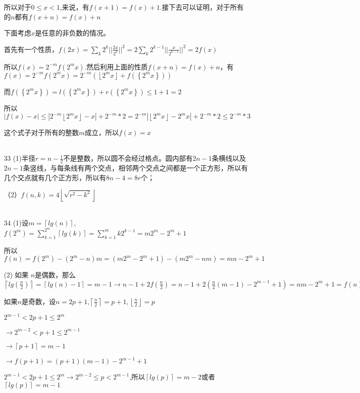 \documentclass[onecolumn]{article}
\begin{document}
所以对于$0 \leq x < 1$,来说，有$f(x+1)=f(x)+1$.接下去可以证明，对于所有的$n$都有$f(x+n)=f(x)+n$ \par
下面考虑$x$是任意的非负数的情况。 \par
首先有一个性质，$f(2x)=\sum _{k}2^{k}||\frac{2x}{2^{k}}||^{2}=2\sum _{k}2^{k-1}||\frac{x}{2^{k-1}}||^{2}=2f(x)$ \par
所以$f(x)=2^{-m}f(2^{m}x)$.然后利用上面的性质$f(x+n)=f(x)+n$，有$f(x)=2^{-m}f(2^{m}x)=2^{-m}(\left \lfloor 2^{m}x \right \rfloor+f(\left \{ 2^{m}x \right \}))$ \par
而$f(\left \{ 2^{m}x \right \})=l(\left \{ 2^{m}x \right \})+r(\left \{ 2^{m}x \right \})\leq 1+1=2$ \par
所以$|f(x)-x|\leq |2^{-m}\left \lfloor 2^{m}x \right \rfloor-x|+2^{-m}*2=2^{-m}|\left \lfloor 2^{m}x \right \rfloor-2^{m}x|+2^{-m}*2\leq 2^{-m}*3$ \par
这个式子对于所有的整数$m$成立，所以$f(x)=x$ \par
~\\
33 (1)半径$r=n-\frac{1}{2}$不是整数，所以圆不会经过格点。圆内部有$2n-1$条横线以及$2n-1$条竖线，与每条线有两个交点，相邻两个交点之间都是一个正方形，所以有几个交点就有几个正方形，所以有$8n-4=8r$个；\par
（2）$f(n,k)=4\left \lfloor \sqrt{r^{2}-k^{2}} \right \rfloor$ \par
~\\
34 (1)设$m=\left \lceil lg(n) \right \rceil$,$f(2^m)=\sum_{k=1}^{2^{m}}\left \lceil lg(k) \right \rceil=\sum_{k=1}^{m}k2^{k-1}=m2^{m}-2^{m}+1$ \par
所以$f(n)=f(2^m)-(2^{m}-n)m=\left (m2^{m}-2^{m}+1  \right )-\left ( m2^{m}-nm \right )=mn-2^{m}+1$ \par
(2) 如果 $n$是偶数，那么$\left \lceil lg(\frac{n}{2}) \right \rceil=\left \lceil lg(n)-1 \right \rceil=m-1\rightarrow n-1+2f(\frac{n}{2})=n-1+2(\frac{n}{2}(m-1)-2^{m-1}+1)=nm-2^{m}+1=f(n)$ \par
如果$n$是奇数，设$n=2p+1$,$\left \lceil \frac{n}{2} \right \rceil=p+1,\left \lfloor \frac{n}{2} \right \rfloor=p$ \par
$2^{m-1}<2p+1\leq 2^{m}$ \par
$\rightarrow 2^{m-2}<p+1\leq 2^{m-1}$ \par
$\rightarrow \left \lceil p+1 \right \rceil=m-1$ \par
$\rightarrow f(p+1)=(p+1)(m-1)-2^{m-1}+1$ \par
$2^{m-1}<2p+1\leq 2^{m}\rightarrow 2^{m-2}\leq p< 2^{m-1}$,所以$\left \lceil lg(p) \right \rceil=m-2$或者$\left \lceil lg(p) \right \rceil=m-1$ \par
\end{document}
